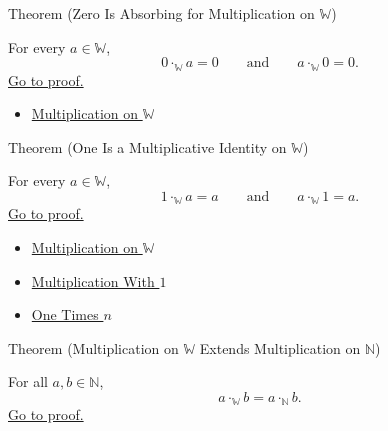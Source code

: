 \begin{theorembox}{Theorem (Zero Is Absorbing for Multiplication on \texorpdfstring{$\mathbb{W}$}{W})}
\begin{theorem}
\label{thm:zero-absorbing-for-multiplication-on-w}
For every $a\in\mathbb{W}$,
\[
0\cdot_{\mathbb{W}}a=0
\qquad\text{and}\qquad
a\cdot_{\mathbb{W}}0=0.
\]
\hyperref[prf:zero-absorbing-for-multiplication-on-w]{Go to proof.}
\end{theorem}
\end{theorembox}

\begin{dependencies}
\begin{itemize}
  \item \hyperref[def:multiplication-on-w]{Multiplication on $\mathbb{W}$}
\end{itemize}
\end{dependencies}

\begin{theorembox}{Theorem (One Is a Multiplicative Identity on \texorpdfstring{$\mathbb{W}$}{W})}
\begin{theorem}
\label{thm:one-multiplicative-identity-on-w}
For every $a\in\mathbb{W}$,
\[
1\cdot_{\mathbb{W}}a=a
\qquad\text{and}\qquad
a\cdot_{\mathbb{W}}1=a.
\]
\hyperref[prf:one-multiplicative-identity-on-w]{Go to proof.}
\end{theorem}
\end{theorembox}

\begin{dependencies}
\begin{itemize}
  \item \hyperref[def:multiplication-on-w]{Multiplication on $\mathbb{W}$}
  \item \hyperref[thm:multiplication-with-one]{Multiplication With $1$}
  \item \hyperref[thm:one-times-n]{One Times $n$}
\end{itemize}
\end{dependencies}

\begin{theorembox}{Theorem (Multiplication on \texorpdfstring{$\mathbb{W}$}{W} Extends Multiplication on \texorpdfstring{$\mathbb{N}$}{N})}
\begin{theorem}
\label{thm:multiplication-on-w-extends-multiplication-on-n}
For all $a,b\in\mathbb{N}$,
\[
a\cdot_{\mathbb{W}}b=a\cdot_{\mathbb{N}}b.
\]
\hyperref[prf:multiplication-on-w-extends-multiplication-on-n]{Go to proof.}
\end{theorem}
\end{theorembox}

